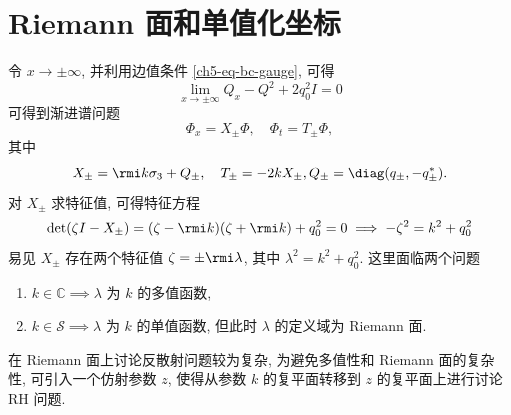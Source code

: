 \section{Riemann 面和单值化坐标}
令 $ x \to \pm \infty $, 并利用边值条件 \eqref{ch5-eq-bc-gauge}, 可得
\begin{equation}
    \lim_{x\to \pm \infty} Q_{x} - Q^{2} + 2 q_{0}^{2}I = 0
\end{equation}
可得到渐进谱问题
\begin{equation}
    \Phi_{x}= X_{\pm} \Phi, \quad \Phi_{t} = T_{\pm} \Phi, \label{ch5-eq-lax-asym}
\end{equation}
其中
\begin{equation}
    X_{\pm} = \rmi k \sigma_{3} + Q_{\pm}, \quad T_{\pm} = -2 k X_{\pm}, Q_{\pm} = \diag(q_{\pm}, -q_{\pm}^{*}).
\end{equation}
对 $ X_{\pm} $ 求特征值, 可得特征方程
\begin{equation}
    \det(\zeta I - X_{\pm}) = (\zeta - \rmi k)(\zeta + \rmi k) + q_{0}^{2} = 0 \implies -\zeta^{2} = k^{2} + q_{0}^{2}
\end{equation}
易见 $ X_{\pm} $ 存在两个特征值 $ \zeta= \pm \rmi \lambda $, 其中 $ \lambda^{2} = k^{2}+ q_{0}^{2}$. 这里面临两个问题
\begin{enumerate}
    \item $ k \in \mathbb{C} \implies \lambda $ 为 $ k $ 的多值函数,
    \item $ k \in \mathcal{S} \implies \lambda $ 为 $ k $ 的单值函数, 但此时 $ \lambda $ 的定义域为 Riemann 面.
\end{enumerate}
在 Riemann 面上讨论反散射问题较为复杂, 为避免多值性和 Riemann 面的复杂性, 可引入一个仿射参数 $ z $, 使得从参数 $ k $ 的复平面转移到 $ z $ 的复平面上进行讨论 RH 问题.

